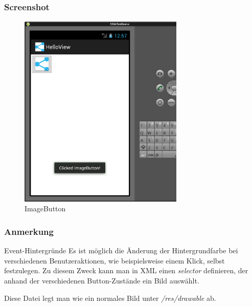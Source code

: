 \begin{frame}
   \frametitle{Screenshot}
	\begin{figure}[h!]
	  \centering
	  \includegraphics[width=0.7\textwidth]{pictures/imagebutton.ps}
	  \caption{
		  ImageButton
	  }
	  \label{fig:imagebutton}
	\end{figure}
\end{frame}

\begin{frame}
   \frametitle{Anmerkung}
	\begin{alertblock}{Event-Hintergründe}
		Es ist möglich die Änderung der Hintergrundfarbe 
		bei verschiedenen Benutzeraktionen, wie beispielsweise einem Klick, selbst 
		festzulegen. Zu diesem Zweck kann man in XML einen \emph{selector} 
		definieren, der anhand der verschiedenen Button-Zustände ein Bild auswählt.

		\vspace{3mm}

		

		\vspace{3mm}

		Diese Datei legt man wie ein normales Bild unter \emph{/res/drawable} ab.
	\end{alertblock}
\end{frame}

